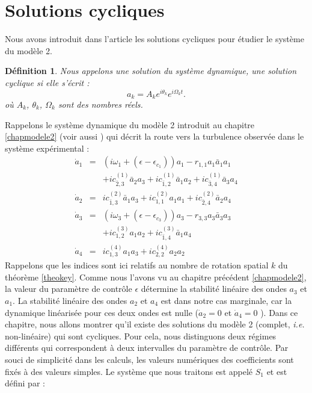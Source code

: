 \documentclass{book}
\newtheorem{defn}{D\'efinition}[chapter]
\begin{document}
\section{Solutions cycliques}
Nous avons introduit dans l'article \cite{Madon96b} les solutions
cycliques pour \'etudier le syst\`eme du
mod\`ele 2. 
\begin{defn}
Nous appelons une solution du syst\`eme dynamique, une solution cyclique
si elle s'\'ecrit :
\begin{equation}\label{equsolcy}
a_k=A_k e^{i\theta_k}e^{i\Omega_k t}.
\end{equation}
o\`u $A_k$, $\theta_k$, $\Omega_k$ sont des nombres r\'eels.
\end{defn}
Rappelons le syst\`eme dynamique du mod\`ele 2 introduit au chapitre
\ref{chapmodele2} (voir aussi \cite{Madon96b}) qui d\'ecrit la route
vers la turbulence observ\'ee dans le syst\`eme exp\'erimental :
\begin{eqnarray}
\dot{a}_1&=&(i\omega_1+(\epsilon-\epsilon_{c_1}))a_1-r_{1,1}a_1\bar{a}_1a_1\nonumber\\
&&+ic^{(1)}_{\bar{2},3}\bar{a}_2{a}_3+ic^{(1)}_{\bar{1},2}\bar{a}_1a_2+ic^{(1)}_{\bar{3},4}\bar{a}_3a_4\\
\dot{a}_2&=&ic^{(2)}_{\bar{1},3}\bar{a}_1{a}_3+ic^{(2)}_{1,1}a_1a_1+ic^{(2)}_{\bar{2},4}\bar{a}_2a_4\\
\dot{a}_3&=&(i\omega_3+(\epsilon-\epsilon_{c_3}))a_3-r_{3,3}a_3\bar{a}_3a_3\nonumber\\
&&+ic^{(3)}_{1,2}a_1a_2+ic^{(3)}_{\bar{1},4}\bar{a}_1a_4\\
\dot{a}_4&=&ic^{(4)}_{1,3}a_1a_3+ic^{(4)}_{2,2}a_2a_2
\end{eqnarray}
Rappelons que les indices sont ici relatifs au nombre de rotation
spatial $k$ du th\'eor\`eme \ref{theokey}.
Comme nous l'avons vu au chapitre pr\'ec\'edent \ref{chapmodele2}, la
valeur du
param\`etre de contr\^ole $\epsilon$ d\'etermine  la stabilit\'e
lin\'eaire des ondes $a_3$ et $a_1$. La stabilit\'e lin\'eaire des
ondes $a_2$ et $a_4$ est dans notre cas marginale, car la dynamique
lin\'earis\'ee pour ces deux ondes est nulle ($\dot a_2=0$ et $\dot
a_4=0$ ).
Dans ce chapitre, nous allons montrer qu'il existe des solutions du
mod\`ele 2 (complet, {\it i.e.}  non-lin\'eaire) qui sont cycliques. 
Pour cela, nous distinguons deux r\'egimes diff\'erents qui correspondent
\`a deux intervalles du param\`etre de contr\^ole.
Par souci de simplicit\'e dans les calculs, les valeurs num\'eriques
des coefficients sont fix\'es \`a des valeurs simples. Le syst\`eme que
nous traitons est appel\'e $S_1$ et est d\'efini par :
\end{document}
